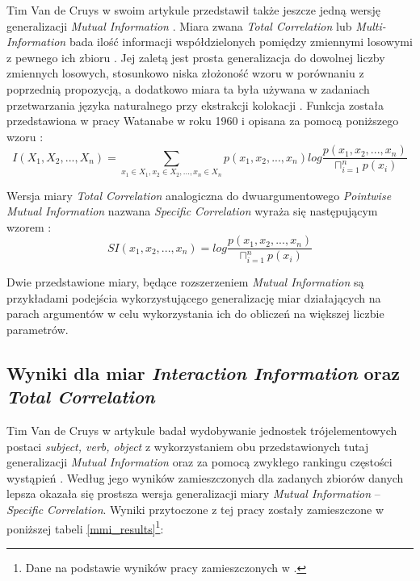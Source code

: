 \par
Tim Van de Cruys w swoim artykule przedstawił także jeszcze jedną wersję generalizacji \emph{Mutual Information} \cite{mmi_w11}.
Miara zwana \emph{Total Correlation} lub \emph{Multi-Information} bada ilość informacji współdzielonych pomiędzy zmiennymi losowymi z pewnego ich zbioru \cite[str. 3]{mmi_w11}.
Jej zaletą jest prosta generalizacja do dowolnej liczby zmiennych losowych, stosunkowo niska złożoność wzoru w porównaniu z poprzednią propozycją, a dodatkowo miara ta była używana w zadaniach przetwarzania języka naturalnego przy ekstrakcji kolokacji \cite[str. 3]{mmi_w11}.
Funkcja została przedstawiona w pracy Watanabe w roku 1960 i opisana za pomocą poniższego wzoru \cite[str. 3]{mmi_w11}:
$$ I(X_{1}, X_{2}, ..., X_{n}) = \sum_{x_{1} \in X_{1}, x_{2} \in X_{2}, ...,  x_{n} \in X_{n}} p(x_{1}, x_{2}, ..., x_{n}) log \frac{p(x_{1}, x_{2}, ..., x_{n})}{\sqcap_{i=1}^{n} p(x_{i})} $$

Wersja miary \emph{Total Correlation} analogiczna do dwuargumentowego \emph{Pointwise Mutual Information} nazwana \emph{Specific Correlation} wyraża się następującym wzorem \cite[str. 3]{mmi_w11}:
$$ SI(x_{1}, x_{2}, ..., x_{n}) = log \frac{p(x_{1}, x_{2}, ..., x_{n})}{\sqcap_{i=1}^{n}p(x_{i})} $$

\par
Dwie przedstawione miary, będące rozszerzeniem \emph{Mutual Information} są przykładami podejścia wykorzystującego generalizację miar działających na parach argumentów w celu wykorzystania ich do obliczeń na większej liczbie parametrów.


\subsection{Wyniki dla miar \emph{Interaction Information} oraz \emph{Total Correlation}}
Tim Van de Cruys w artykule \cite{mmi_w11} badał wydobywanie jednostek trójelementowych postaci \emph{subject, verb, object} z wykorzystaniem obu przedstawionych tutaj generalizacji \emph{Mutual Information} oraz za pomocą zwykłego rankingu częstości wystąpień \cite[str. 4]{mmi_w11}.
Według jego wyników zamieszczonych dla zadanych zbiorów danych lepsza okazała się prostsza wersja generalizacji miary \emph{Mutual Information} -- \emph{Specific Correlation}.
Wyniki przytoczone z tej pracy zostały zamieszczone w poniższej tabeli \ref{mmi_results}\footnote{Dane na podstawie wyników pracy zamieszczonych w \cite[str. 4]{mmi_w11}.}:

